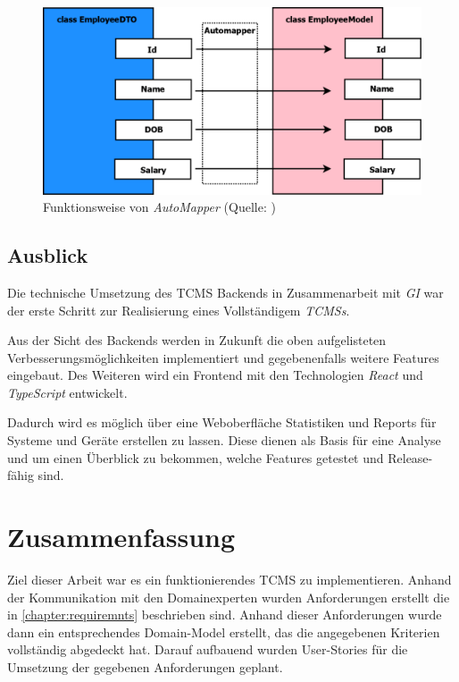 \documentclass[a4paper, fontsize=11pt, parskip=half, twoside]{scrreprt}
\begin{document}
	\begin{figure}[ht]
		\centering
		\includegraphics[scale=0.3]{assets/AutoMapper_example.png}
		\caption{Funktionsweise von \emph{AutoMapper} (Quelle: \textcite{sanjay_implement_2020})}
		\label{fig:autoMapperExample}
	\end{figure}
	
	\section{Ausblick}
	Die technische Umsetzung des \ac{TCMS} Backends in Zusammenarbeit mit \emph{\acl{GI}} war der erste Schritt zur Realisierung eines Vollständigem \emph{\acl{TCMS}s}.
	
	Aus der Sicht des Backends werden in Zukunft die oben aufgelisteten Verbesserungsmöglichkeiten implementiert und gegebenenfalls weitere Features eingebaut.
	Des Weiteren wird ein Frontend mit den Technologien \emph{React} und \emph{TypeScript} entwickelt.
	
	Dadurch wird es möglich über eine Weboberfläche Statistiken und Reports für Systeme und Geräte erstellen zu lassen. Diese dienen als Basis für eine Analyse und um einen Überblick zu bekommen, welche Features getestet und Release-fähig sind.
	
	\chapter{Zusammenfassung}
	Ziel dieser Arbeit war es ein funktionierendes \ac{TCMS} zu implementieren. 
	Anhand der Kommunikation mit den Domainexperten wurden Anforderungen erstellt die in \autoref{chapter:requiremnts} beschrieben sind.
	Anhand dieser Anforderungen wurde dann ein entsprechendes Domain-Model erstellt, das die angegebenen Kriterien vollständig abgedeckt hat.
	Darauf aufbauend wurden User-Stories für die Umsetzung der gegebenen Anforderungen geplant.	
	
\end{document}
